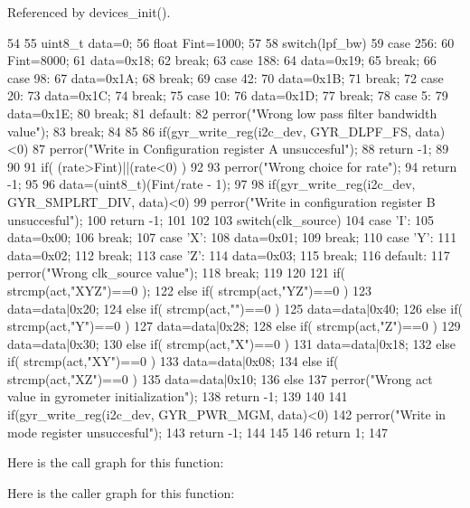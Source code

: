 Referenced by devices\_\-init().




\begin{DoxyCode}
54 { 
55   uint8_t data=0;
56   float Fint=1000;
57 
58   switch(lpf_bw){
59     case 256:
60       Fint=8000;
61       data=0x18;
62       break;
63     case 188:
64       data=0x19;
65       break;
66     case 98:
67       data=0x1A;
68       break;
69     case 42:
70       data=0x1B;
71       break;
72     case 20:
73       data=0x1C;
74       break;
75     case 10:
76       data=0x1D;
77       break;
78     case 5:
79       data=0x1E;
80       break;
81     default:
82       perror("Wrong low pass filter bandwidth value");
83       break;
84   }
85   
86   if(gyr_write_reg(i2c_dev, GYR_DLPF_FS, data)<0){
87     perror("Write in Configuration register A unsuccesful");
88     return -1;
89   }
90 
91   if( (rate>Fint)||(rate<0) )
92   {
93     perror("Wrong choice for rate");
94     return -1;
95   }
96   data=(uint8_t)(Fint/rate - 1);
97   
98   if(gyr_write_reg(i2c_dev, GYR_SMPLRT_DIV, data)<0){
99     perror("Write in configuration register B unsuccesful");
100     return -1;
101   }
102       
103   switch(clk_source){
104     case 'I':
105       data=0x00;
106       break;
107     case 'X':
108       data=0x01;
109       break;
110     case 'Y':
111       data=0x02;
112       break;
113     case 'Z':
114       data=0x03;
115       break;
116     default:
117       perror("Wrong clk_source value");
118       break;
119   }
120       
121   if( strcmp(act,"XYZ")==0 );
122   else if( strcmp(act,"YZ")==0 )
123       data=data|0x20;
124   else if( strcmp(act,"")==0 )
125       data=data|0x40;
126   else if( strcmp(act,"Y")==0 )
127       data=data|0x28;
128   else if( strcmp(act,"Z")==0 )
129       data=data|0x30;
130   else if( strcmp(act,"X")==0 )
131       data=data|0x18;
132   else if( strcmp(act,"XY")==0 )
133       data=data|0x08;
134   else if( strcmp(act,"XZ")==0 )
135       data=data|0x10;
136   else{
137     perror("Wrong act value in gyrometer initialization");
138     return -1;
139   }
140    
141   if(gyr_write_reg(i2c_dev, GYR_PWR_MGM, data)<0){
142     perror("Write in mode register unsuccesful");
143     return -1;
144   }
145   
146   return 1;
147 }
\end{DoxyCode}




Here is the call graph for this function:



Here is the caller graph for this function:


